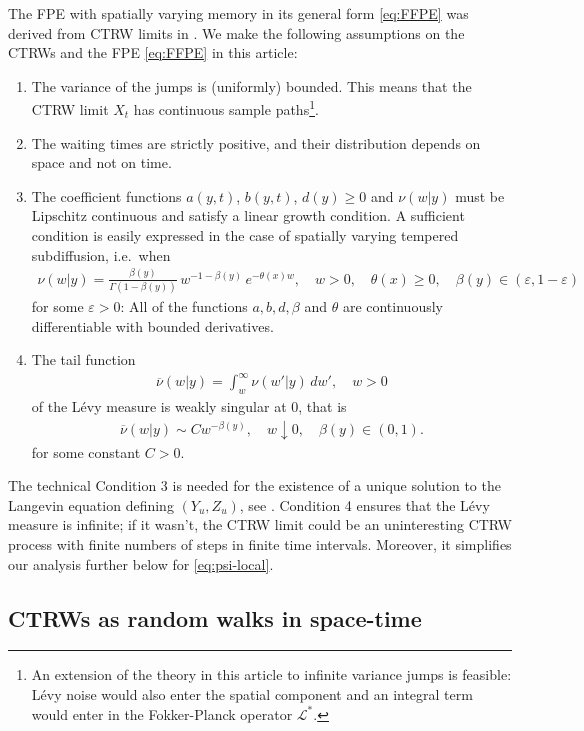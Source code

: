 \documentclass[a4paper,12pt]{elsarticle}
\numberwithin{equation}{section}
\theoremstyle{plain}
\theoremstyle{definition}
\theoremstyle{remark}
\numberwithin{equation}{section}
\newcommand{\1}{\mathbf 1}
\begin{document}
The FPE with spatially varying memory in its general form \eqref{eq:FFPE} was derived from CTRW limits in \cite{BaeumerStraka16}.  We make the following assumptions on the CTRWs and the FPE \eqref{eq:FFPE} in this article: 
\begin{enumerate}
\item
The variance of the jumps is (uniformly) bounded.  This means that the CTRW limit $X_t$ has continuous sample paths\footnote{An extension of the theory in this article to infinite variance jumps is feasible: L\'evy noise would also enter the spatial component and an integral term would enter in the Fokker-Planck operator $\mathcal L^*$.}.
\item
The waiting times are strictly positive, and their distribution depends on space and not on time. 
\item
The coefficient functions $a(y,t)$, $b(y,t)$, $d(y) \ge 0$ and $\nu(w|y)$ must be Lipschitz continuous and satisfy a linear growth condition.  
A sufficient condition is easily expressed in the case of spatially varying tempered subdiffusion, i.e.\ when
\begin{align}
\nu(w|y) = \frac{\beta(y)}{\Gamma(1-\beta(y))}\, w^{-1-\beta(y)}\,
e^{-\theta(x) w}, \quad w > 0, \quad \theta(x) \ge 0, \quad \beta(y) \in (\varepsilon,1-\varepsilon)
\end{align}
for some $\varepsilon > 0$: All of the functions $a, b, d, \beta$ and $\theta$ are continuously differentiable with bounded derivatives. 
\item
The tail function 
\begin{align}
\overline \nu(w | y) = \int_w^\infty \nu(w'|y)\,dw', \quad w > 0
\end{align}
of the L\'evy measure is weakly singular at $0$, that is
\begin{align} \label{eq:ass4}
\overline \nu(w|y) \sim C w^{-\beta(y)}, \quad w \downarrow 0, 
\quad \beta(y) \in (0,1).
\end{align}
for some constant $C > 0$. 
\end{enumerate}
The technical Condition 3 is needed for the existence of a unique solution to the Langevin equation defining $(Y_u, Z_u)$, see \cite{Straka17}. 
Condition 4 ensures that the L\'evy measure is infinite; if it wasn't, the CTRW limit could be an uninteresting CTRW process with finite numbers of steps in finite time intervals.  Moreover, it simplifies our analysis further below for \eqref{eq:psi-local}.


\subsection{CTRWs as random walks in space-time}
\end{document}
